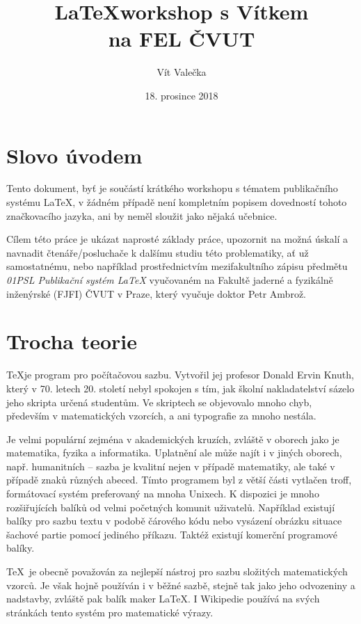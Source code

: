 \documentclass{article}
\title{\textbf{\LaTeX\enspace workshop s Vítkem}\\
	\uv{Studenti studentům} na FEL ČVUT}
\date{18. prosince 2018}
\author{Vít Valečka}
\begin{document}
\maketitle

\vspace{10em}

\section*{Slovo úvodem}

Tento dokument, byť je součástí krátkého workshopu s tématem publikačního systému \LaTeX, v žádném případě není kompletním popisem dovedností tohoto značkovacího jazyka, ani by neměl sloužit jako nějaká učebnice.

Cílem této práce je ukázat naprosté základy práce, upozornit na možná úskalí a navnadit čtenáře/posluchače k dalšímu studiu této problematiky, ať už samostatnému, nebo například prostřednictvím mezifakultního zápisu předmětu \emph{01PSL Publikační systém \LaTeX} vyučovaném na Fakultě jaderné a fyzikálně inženýrské (FJFI) ČVUT v Praze, který vyučuje doktor Petr Ambrož.

\clearpage

\section{Trocha teorie}

\TeX\enspace je program pro počítačovou sazbu. Vytvořil jej profesor Donald Ervin Knuth, který v 70. letech 20. století nebyl spokojen s tím, jak školní nakladatelství sázelo jeho skripta určená studentům. Ve skriptech se objevovalo mnoho chyb, především v matematických vzorcích, a ani typografie za mnoho nestála.

Je velmi populární zejména v akademických kruzích, zvláště v oborech jako je matematika, fyzika a informatika. Uplatnění ale může najít i v jiných oborech, např. humanitních – sazba je kvalitní nejen v případě matematiky, ale také v případě znaků různých abeced. Tímto programem byl z větší části vytlačen troff, formátovací systém preferovaný na mnoha Unixech. K dispozici je mnoho rozšiřujících balíků od velmi početných komunit uživatelů. Například existují balíky pro sazbu textu v podobě čárového kódu nebo vysázení obrázku situace šachové partie pomocí jediného příkazu. Taktéž existují komerční programové balíky.

\TeX\  je obecně považován za nejlepší nástroj pro sazbu složitých matematických vzorců. Je však hojně používán i v běžné sazbě, stejně tak jako jeho odvozeniny a nadstavby, zvláště pak balík maker \LaTeX. I Wikipedie používá na svých stránkách tento systém pro matematické výrazy.
\end{document}
